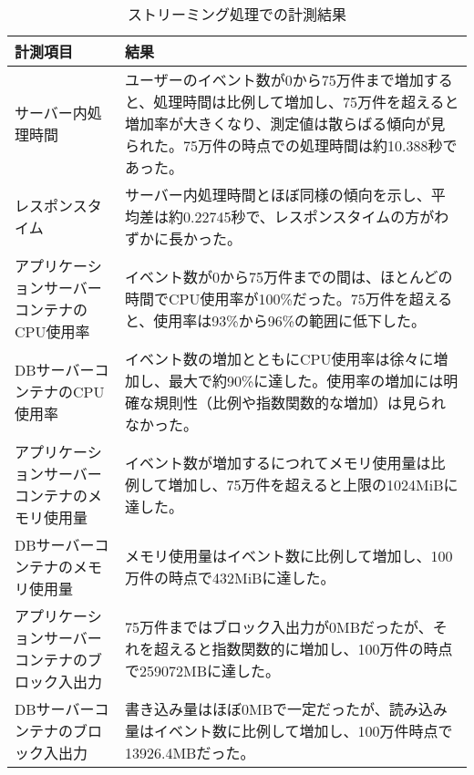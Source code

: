 \documentclass[../../../main]{subfiles}
\begin{document}
    \begin{table}[H]
        \centering
        \caption{ストリーミング処理での計測結果}
        \label{tab:result-streaming}
        \begin{tabular}{|p{4cm}|p{10cm}|}
            \hline
            \textbf{計測項目}                & \textbf{結果}                                                                                                              \\ \hline
            サーバー内処理時間                    & ユーザーのイベント数が0から75万件まで増加すると、処理時間は比例して増加し、75万件を超えると増加率が大きくなり、測定値は散らばる傾向が見られた。75万件の時点での処理時間は約10.388秒であった。                    \\ \hline
            レスポンスタイム                     & サーバー内処理時間とほぼ同様の傾向を示し、平均差は約0.22745秒で、レスポンスタイムの方がわずかに長かった。                                                                 \\ \hline
            アプリケーションサーバーコンテナのCPU使用率      & イベント数が0から75万件までの間は、ほとんどの時間でCPU使用率が100\%だった。75万件を超えると、使用率は93\%から96\%の範囲に低下した。                                             \\ \hline
            DBサーバーコンテナのCPU使用率            & イベント数の増加とともにCPU使用率は徐々に増加し、最大で約90\%に達した。使用率の増加には明確な規則性（比例や指数関数的な増加）は見られなかった。                                              \\ \hline
            アプリケーションサーバーコンテナのメモリ使用量      & イベント数が増加するにつれてメモリ使用量は比例して増加し、75万件を超えると上限の1024MiBに達した。                                                                    \\ \hline
            DBサーバーコンテナのメモリ使用量            & メモリ使用量はイベント数に比例して増加し、100万件の時点で432MiBに達した。                                                                                \\ \hline
            アプリケーションサーバーコンテナのブロック入出力     & 75万件まではブロック入出力が0MBだったが、それを超えると指数関数的に増加し、100万件の時点で259072MBに達した。                                                           \\ \hline
            DBサーバーコンテナのブロック入出力           & 書き込み量はほぼ0MBで一定だったが、読み込み量はイベント数に比例して増加し、100万件時点で13926.4MBだった。                                                             \\ \hline

\end{tabular}
\end{table}
\end{document}
